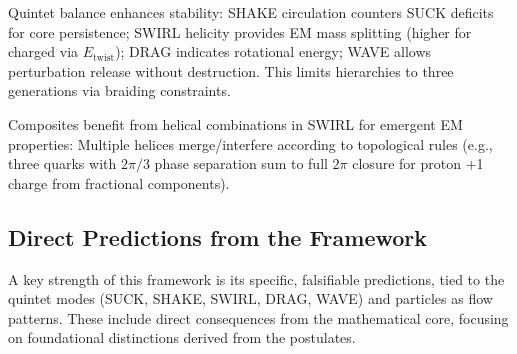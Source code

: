 Quintet balance enhances stability: SHAKE circulation counters SUCK deficits for core persistence; SWIRL helicity provides EM mass splitting (higher for charged via $E_{\text{twist}}$); DRAG indicates rotational energy; WAVE allows perturbation release without destruction. This limits hierarchies to three generations via braiding constraints.

Composites benefit from helical combinations in SWIRL for emergent EM properties: Multiple helices merge/interfere according to topological rules (e.g., three quarks with $2\pi/3$ phase separation sum to full $2\pi$ closure for proton +1 charge from fractional components).

\medskip

\subsection{Direct Predictions from the Framework}

A key strength of this framework is its specific, falsifiable predictions, tied to the quintet modes (SUCK, SHAKE, SWIRL, DRAG, WAVE) and particles as flow patterns. These include direct consequences from the mathematical core, focusing on foundational distinctions derived from the postulates.

